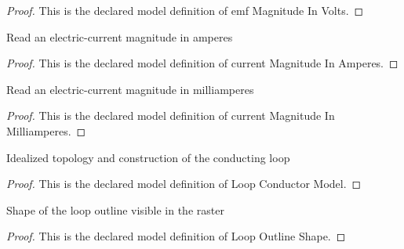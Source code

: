 \begin{proof}
  This is the declared model definition of emf Magnitude In Volts.
\end{proof}
\begin{definition}
  \label{def:physics:phyx-mini-0926:phyxminiproblems-problemphyxmini0926-currentmagnitudeinamperes}
  Read an electric-current magnitude in amperes
\end{definition}
\begin{proof}
  This is the declared model definition of current Magnitude In Amperes.
\end{proof}
\begin{definition}
  \label{def:physics:phyx-mini-0926:phyxminiproblems-problemphyxmini0926-currentmagnitudeinmilliamperes}
  Read an electric-current magnitude in milliamperes
\end{definition}
\begin{proof}
  This is the declared model definition of current Magnitude In Milliamperes.
\end{proof}
\begin{definition}
  \label{def:physics:phyx-mini-0926:phyxminiproblems-problemphyxmini0926-loopconductormodel}
  Idealized topology and construction of the conducting loop
\end{definition}
\begin{proof}
  This is the declared model definition of Loop Conductor Model.
\end{proof}
\begin{definition}
  \label{def:physics:phyx-mini-0926:phyxminiproblems-problemphyxmini0926-loopoutlineshape}
  Shape of the loop outline visible in the raster
\end{definition}
\begin{proof}
  This is the declared model definition of Loop Outline Shape.
\end{proof}
